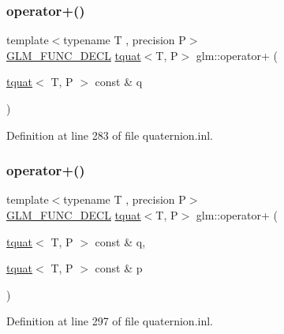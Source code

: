 \subsubsection{\texorpdfstring{operator+()}{operator+()}\hspace{0.1cm}{\footnotesize\ttfamily [1/2]}}
{\footnotesize\ttfamily template$<$typename T , precision P$>$ \\
\mbox{\hyperlink{setup_8hpp_ab2d052de21a70539923e9bcbf6e83a51}{G\+L\+M\+\_\+\+F\+U\+N\+C\+\_\+\+D\+E\+CL}} \mbox{\hyperlink{structglm_1_1tquat}{tquat}}$<$T, P$>$ glm\+::operator+ (\begin{DoxyParamCaption}\item[{\mbox{\hyperlink{structglm_1_1tquat}{tquat}}$<$ T, P $>$ const \&}]{q }\end{DoxyParamCaption})}



Definition at line 283 of file quaternion.\+inl.

\mbox{\label{group__gtc__quaternion_ga517657374d8ca180d63c33ff9430518a}} 
\subsubsection{\texorpdfstring{operator+()}{operator+()}\hspace{0.1cm}{\footnotesize\ttfamily [2/2]}}
{\footnotesize\ttfamily template$<$typename T , precision P$>$ \\
\mbox{\hyperlink{setup_8hpp_ab2d052de21a70539923e9bcbf6e83a51}{G\+L\+M\+\_\+\+F\+U\+N\+C\+\_\+\+D\+E\+CL}} \mbox{\hyperlink{structglm_1_1tquat}{tquat}}$<$T, P$>$ glm\+::operator+ (\begin{DoxyParamCaption}\item[{\mbox{\hyperlink{structglm_1_1tquat}{tquat}}$<$ T, P $>$ const \&}]{q,  }\item[{\mbox{\hyperlink{structglm_1_1tquat}{tquat}}$<$ T, P $>$ const \&}]{p }\end{DoxyParamCaption})}



Definition at line 297 of file quaternion.\+inl.

\mbox{\label{group__gtc__quaternion_ga76d2d3e18c09dbd336ba90b498fefbba}} 
